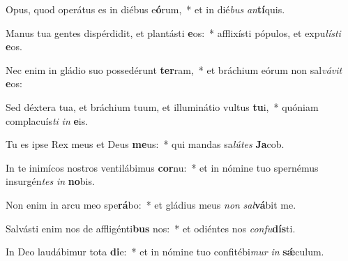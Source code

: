 \item Opus, quod operátus es in diébus e\textbf{ó}rum,~* et in dié\textit{bus} \textit{an}\textbf{tí}quis.
\item Manus tua gentes dispérdidit, et plantásti \textbf{e}os:~* afflixísti pópulos, et expu\textit{lís}\textit{ti} \textbf{e}os.
\item Nec enim in gládio suo possedérunt \textbf{ter}ram,~* et bráchium eórum non sal\textit{vá}\textit{vit} \textbf{e}os:
\item Sed déxtera tua, et bráchium tuum, et illuminátio vultus \textbf{tu}i,~* quóniam complacuís\textit{ti} \textit{in} \textbf{e}is.
\item Tu es ipse Rex meus et Deus \textbf{me}us:~* qui mandas sa\textit{lú}\textit{tes} \textbf{Ja}cob.
\item In te inimícos nostros ventilábimus \textbf{cor}nu:~* et in nómine tuo spernémus insurgén\textit{tes} \textit{in} \textbf{no}bis.
\item Non enim in arcu meo spe\textbf{rá}bo:~* et gládius meus \textit{non} \textit{sal}\textbf{vá}bit me.
\item Salvásti enim nos de affligénti\textbf{bus} nos:~* et odiéntes nos \textit{con}\textit{fu}\textbf{dís}ti.
\item In Deo laudábimur tota \textbf{di}e:~* et in nómine tuo confitébi\textit{mur} \textit{in} \textbf{sǽ}culum.
